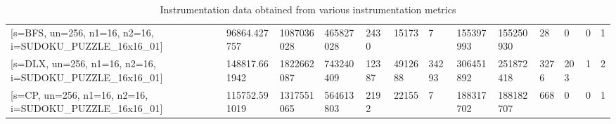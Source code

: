 \documentclass[10pt,twocolumn]{article}
\begin{document}
\begin{table}[p]
{\begin{tabular}{@{}lllllllllllll@{}}
    {\color[HTML]{000000} {[}s=BFS, un=256, n1=16, n2=16, i=SUDOKU\_PUZZLE\_16x16\_01{]}} & {\color[HTML]{000000} 96864.427757}  & {\color[HTML]{000000} 1087036028}   & {\color[HTML]{000000} 465827028}    & {\color[HTML]{000000} 2430}           & {\color[HTML]{000000} 15173}        & {\color[HTML]{000000} 7}           & {\color[HTML]{000000} 155397993}    & {\color[HTML]{000000} 155250930}     & {\color[HTML]{000000} 28}     & {\color[HTML]{000000} 0}        & {\color[HTML]{000000} 0}         & {\color[HTML]{000000} 1}              \\
    {\color[HTML]{000000} {[}s=DLX, un=256, n1=16, n2=16, i=SUDOKU\_PUZZLE\_16x16\_01{]}} & {\color[HTML]{000000} 148817.661942} & {\color[HTML]{000000} 1822662087}   & {\color[HTML]{000000} 743240409}    & {\color[HTML]{000000} 12387}          & {\color[HTML]{000000} 4912688}      & {\color[HTML]{000000} 34293}       & {\color[HTML]{000000} 306451892}    & {\color[HTML]{000000} 251872418}     & {\color[HTML]{000000} 3276}   & {\color[HTML]{000000} 203}      & {\color[HTML]{000000} 1}         & {\color[HTML]{000000} 2}              \\
    {\color[HTML]{000000} {[}s=CP, un=256, n1=16, n2=16, i=SUDOKU\_PUZZLE\_16x16\_01{]}}  & {\color[HTML]{000000} 115752.591019} & {\color[HTML]{000000} 1317551065}   & {\color[HTML]{000000} 564613803}    & {\color[HTML]{000000} 2192}           & {\color[HTML]{000000} 22155}        & {\color[HTML]{000000} 7}           & {\color[HTML]{000000} 188317702}    & {\color[HTML]{000000} 188182707}     & {\color[HTML]{000000} 668}    & {\color[HTML]{000000} 0}        & {\color[HTML]{000000} 0}         & {\color[HTML]{000000} 1}              \\ \bottomrule
    \end{tabular}%
    }
    \caption{Instrumentation data obtained from various instrumentation metrics}
    \label{table:myTable1}
\end{table}%
\end{document}
